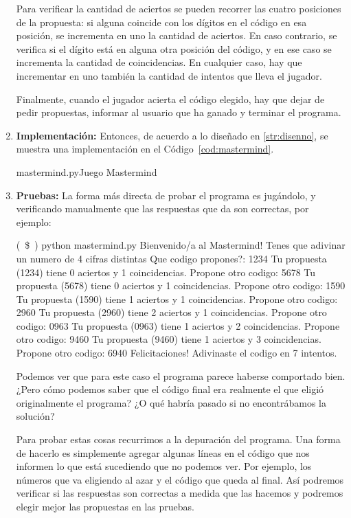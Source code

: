 \begin{enumerate}
Para verificar la cantidad de aciertos se pueden recorrer las cuatro posiciones
de la propuesta: si alguna coincide con los dígitos en el código en esa
posición, se incrementa en uno la cantidad de aciertos. En caso contrario, se
verifica si el dígito está en alguna otra posición del código, y en ese caso se
incrementa la cantidad de coincidencias. En cualquier caso, hay que incrementar
en uno también la cantidad de intentos que lleva el jugador.

Finalmente, cuando el jugador acierta el código elegido, hay que dejar de pedir
propuestas, informar al usuario que ha ganado y terminar el programa.

\item {\bf Implementación:}
Entonces, de acuerdo a lo diseñado en \ref{str:disenno}, se muestra una
implementación en el Código~\ref{cod:mastermind}.

\begin{codigo}{\label{cod:mastermind} mastermind.py}{Juego Mastermind}

\end{codigo}

\item {\bf Pruebas:}
La forma más directa de probar el programa es jugándolo, y verificando
manualmente que las respuestas que da son correctas, por ejemplo:

\begin{codigo-nohl-sn}
(~\$~) python mastermind.py
Bienvenido/a al Mastermind!
Tenes que adivinar un numero de 4 cifras distintas
Que codigo propones?: 1234
Tu propuesta (1234) tiene 0 aciertos y  1 coincidencias.
Propone otro codigo: 5678
Tu propuesta (5678) tiene 0 aciertos y  1 coincidencias.
Propone otro codigo: 1590
Tu propuesta (1590) tiene 1 aciertos y  1 coincidencias.
Propone otro codigo: 2960
Tu propuesta (2960) tiene 2 aciertos y  1 coincidencias.
Propone otro codigo: 0963
Tu propuesta (0963) tiene 1 aciertos y  2 coincidencias.
Propone otro codigo: 9460
Tu propuesta (9460) tiene 1 aciertos y  3 coincidencias.
Propone otro codigo: 6940
Felicitaciones! Adivinaste el codigo en 7 intentos.
\end{codigo-nohl-sn}

Podemos ver que para este caso el programa parece haberse comportado bien.
¿Pero cómo podemos saber que el código final era realmente el que eligió
originalmente el programa? ¿O qué habría pasado si no encontrábamos la
solución?

Para probar estas cosas recurrimos a la depuración del programa. Una forma
de hacerlo es simplemente agregar algunas líneas en el código que nos
informen lo que está sucediendo que no podemos ver. Por ejemplo, los
números que va eligiendo al azar y el código que queda al final. Así
podremos verificar si las respuestas son correctas a medida que las hacemos
y podremos elegir mejor las propuestas en las pruebas.


\end{enumerate}
